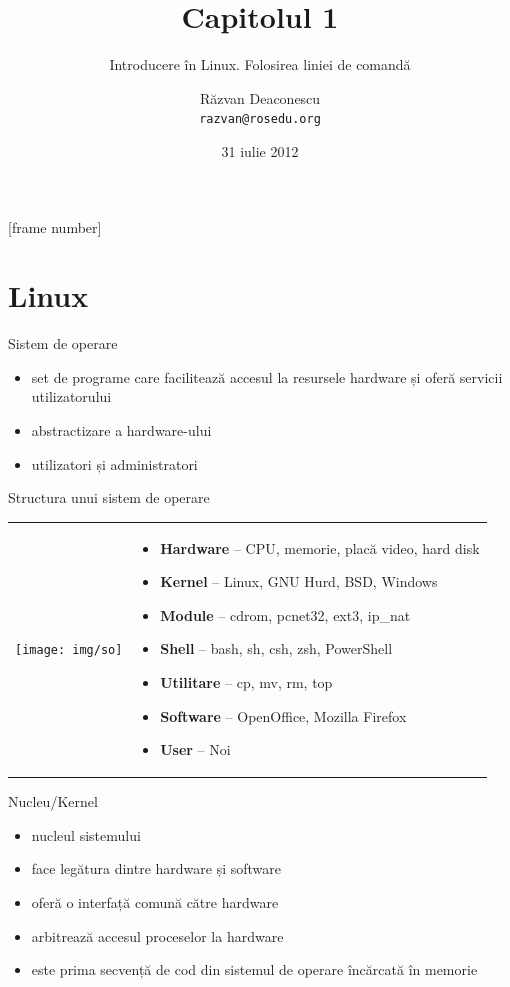 \documentclass{beamer}
\title[Capitolul 1]{Capitolul 1}
\subtitle{Introducere în Linux. Folosirea liniei de comandă}
\author{Răzvan Deaconescu \\
   \texttt{razvan@rosedu.org}}
\date{31 iulie 2012}
\begin{document}
[frame number]

\frame{\titlepage}

\section{Linux}

\begin{frame}{Sistem de operare}
  \begin{itemize}
    \item set de programe care facilitează accesul la resursele hardware și
      oferă servicii utilizatorului
    \item abstractizare a hardware-ului
    \item utilizatori și administratori
  \end{itemize}
\end{frame}

\begin{frame}{Structura unui sistem de operare}
  \begin{tabular}{m{}m{}}
    \texttt{[image: img/so]}
    &
    \begin{itemize}
      \item \textbf{Hardware} -- CPU, memorie, placă video, hard disk
      \item \textbf{Kernel} -- Linux, GNU Hurd, BSD, Windows
      \item \textbf{Module} -- cdrom, pcnet32, ext3, ip\_nat
      \item \textbf{Shell} -- bash, sh, csh, zsh, PowerShell
      \item \textbf{Utilitare} -- cp, mv, rm, top
      \item \textbf{Software} -- OpenOffice, Mozilla Firefox
      \item \textbf{User} -- Noi
    \end{itemize}
  \end{tabular}
\end{frame}

\begin{frame}{Nucleu/Kernel}
  \begin{itemize}
    \item<1-> nucleul sistemului
    \item<2-> face legătura dintre hardware și software
    \item<3-> oferă o interfață comună către hardware
    \item<4-> arbitrează accesul proceselor la hardware
    \item<5-> este prima secvență de cod din sistemul de operare încărcată în
      memorie
  \end{itemize}
\end{frame}
\end{document}
